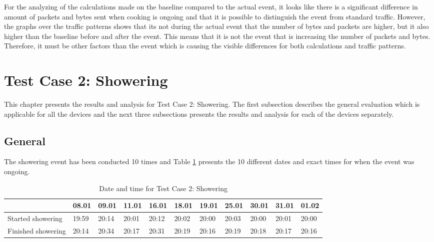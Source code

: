 For the analyzing of the calculations made on the baseline compared to the actual event, it looks like there is a significant difference in amount of packets and bytes sent when cooking is ongoing and that it is possible to distinguish the event from standard traffic. However, the graphs over the traffic patterns shows that its not during the actual event that the number of bytes and packets are higher, but it also higher than the baseline before and after the event. This means that it is not the event that is increasing the number of packets and bytes. Therefore, it must be other factors than the event which is causing the visible differences for both calculations and traffic patterns. 

\newpage
\section{Test Case 2: Showering}
This chapter presents the results and analysis for Test Case 2: Showering. The first subsection describes the general evaluation which is applicable for all the devices and the next three subsections presents the results and analysis for each of the devices separately. 
\subsection{General}
The showering event has been conducted 10 times and Table \ref{tab:ShoweringDates} presents the 10 different dates and exact times for when the event was ongoing.
\begin{table}[H]
    \centering
    \caption{Date and time for Test Case 2: Showering}
    \begin{adjustbox}{width=1\textwidth} 
        \begin{tabular}{l|l|l|l|l|l|l|l|l|l|l|}
            \cline{2-11}
                & 08.01 & 09.01 & 11.01 & 16.01 & 18.01 & 19.01 & 25.01 & 30.01 & 31.01 & 01.02 \\ \hline
            \multicolumn{1}{|l|}{Started showering}  & 19:59 & 20:14 & 20:01 & 20:12 & 20:02 & 20:00 & 20:03 & 20:00 & 20:01 & 20:00 \\ \hline
            \multicolumn{1}{|l|}{Finished showering} & 20:14 & 20:34 & 20:17 & 20:31 & 20:19 & 20:16 & 20:19 & 20:18 & 20:17 & 20:16 \\ \hline
        \end{tabular}
    \end{adjustbox}
    \label{tab:ShoweringDates}
\end{table}

